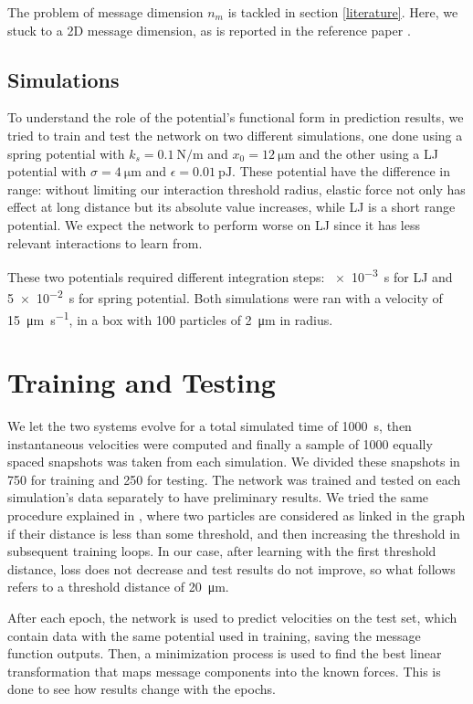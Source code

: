 \documentclass[../../master_thesis_np.tex]{subfiles}
\begin{document}
The problem of message dimension $n_m$ is tackled in section \ref{literature}. 
Here, we stuck to a 2D message dimension, as is reported in the reference paper \cite{ruiz-garcia_discovering_2024}.

\subsection{Simulations}
To understand the role of the potential's functional form in prediction results, we tried to train and test the network on two different simulations, one done using a spring potential with $k_s = \SI{0.1}{\newton\per\meter}$ and $x_0 = \SI{12}{\um}$ and the other using a LJ potential with $\sigma = \SI{4}{\um}$ and $\epsilon = \SI{0.01}{\pico\joule}$.
These potential have the difference in range: without limiting our interaction threshold radius, elastic force not only has effect at long distance but its absolute value increases, while LJ is a short range potential.
We expect the network to perform worse on LJ since it has less relevant interactions to learn from.

These two potentials required different integration steps: \SI{e-3}{\second} for LJ and \SI{5e-2}{\second} for spring potential.
Both simulations were ran with a velocity of \SI{15}{\um \per \second}, in a  box with \num{100} particles of \SI{2}{\um} in radius.

\section{Training and Testing}

We let the two systems evolve for a total simulated time of \SI{1000}{\second}, then instantaneous velocities were computed and finally a sample of \num{1000} equally spaced snapshots was taken from each simulation.
We divided these snapshots in \num{750} for training and \num{250} for testing.
The network was trained and tested on each simulation's data separately to have preliminary results.
We tried the same procedure explained in \cite{ruiz-garcia_discovering_2024}, where two particles are considered as linked in the graph if their distance is less than some threshold, and then increasing the threshold in subsequent training loops.
In our case, after learning with the first threshold distance, loss does not decrease and test results do not improve, so what follows refers to a threshold distance of \SI{20}{\um}.

After each epoch, the network is used to predict velocities on the test set, which contain data with the same potential used in training, saving the message function outputs.
Then, a minimization process is used to find the best linear transformation that maps message components into the known forces.
This is done to see how results change with the epochs.
\end{document}
